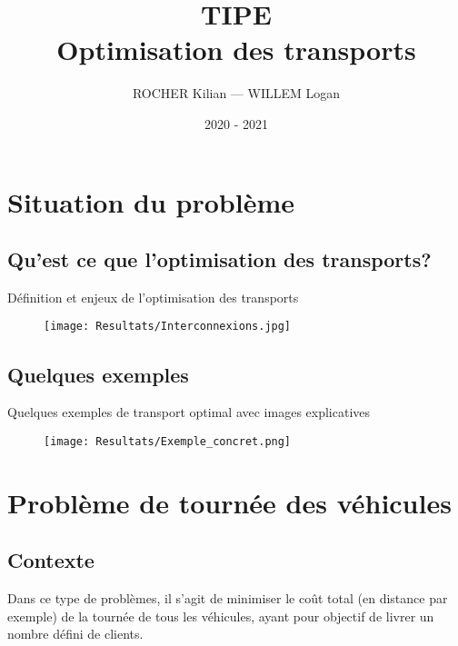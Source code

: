 \documentclass[10pt]{beamer}
\title[TIPE — Optimisation des transports]{TIPE \\ Optimisation des transports}
\author{ROCHER Kilian — WILLEM Logan}
\date{2020 - 2021}
\begin{document}
	\begin{frame}[plain]
		\maketitle
	\end{frame}

	\begin{frame}[plain]
		\tableofcontents
	\end{frame}

	\section{Situation du problème}
	
	\subsection{Qu'est ce que l'optimisation des transports?}
	
	\begin{frame}
		 Définition et enjeux de l'optimisation des transports
		 \begin{figure}
		    \texttt{[image: Resultats/Interconnexions.jpg]}
		 \end{figure}
	\end{frame}
	
	\subsection{Quelques exemples}
	
	\begin{frame}
		Quelques exemples de transport optimal avec images explicatives
		\begin{figure}
		   \texttt{[image: Resultats/Exemple\_concret.png]}
		\end{figure}
	\end{frame}
	
	\section{Problème de tournée des véhicules}
	
	\subsection{Contexte}
	
	\begin{frame}
		Dans ce type de problèmes, il s'agit de minimiser le coût total (en distance par exemple) de la tournée de tous les véhicules, ayant pour objectif de livrer un nombre défini de clients.
	\end{frame}
\end{document}
